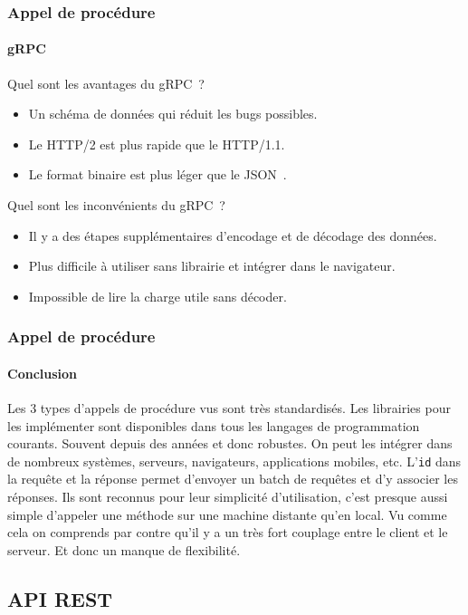 \documentclass{beamer}
\begin{document}
    \begin{frame}
        \transdissolve
        \frametitle{Appel de procédure}
        \framesubtitle{gRPC}
        Quel sont les avantages du gRPC~?
        \pause
        \bigbreak
        \begin{itemize}
            \item Un schéma de données qui réduit les bugs possibles.
            \item Le HTTP/2 est plus rapide que le HTTP/1.1.
            \item Le format binaire est plus léger que le JSON~.
        \end{itemize}
        \bigbreak
        Quel sont les inconvénients du gRPC~?
        \pause
        \bigbreak
        \begin{itemize}
            \item Il y a des étapes supplémentaires d'encodage et de décodage des données.
            \item Plus difficile à utiliser sans librairie et intégrer dans le navigateur.
            \item Impossible de lire la charge utile sans décoder.
        \end{itemize}
    \end{frame}

    \begin{frame}
        \transdissolve
        \frametitle{Appel de procédure}
        \framesubtitle{Conclusion}
        Les 3 types d'appels de procédure vus sont très standardisés.
        Les librairies pour les implémenter sont disponibles dans tous les langages de programmation courants.
        Souvent depuis des années et donc robustes.
        \bigbreak
        On peut les intégrer dans de nombreux systèmes, serveurs, navigateurs, applications mobiles, etc.
        \bigbreak
        L'\lstinline{id} dans la requête et la réponse permet d'envoyer un batch de requêtes et d'y associer les réponses.
        \bigbreak
        Ils sont reconnus pour leur simplicité d'utilisation, c'est presque aussi simple d'appeler une méthode sur une machine distante qu'en local.
        Vu comme cela on comprends par contre qu'il y a un très fort couplage entre le client et le serveur.
        Et donc un manque de flexibilité.
    \end{frame}

    \subsection{API REST}\label{subsec:api-rest}
\end{document}
